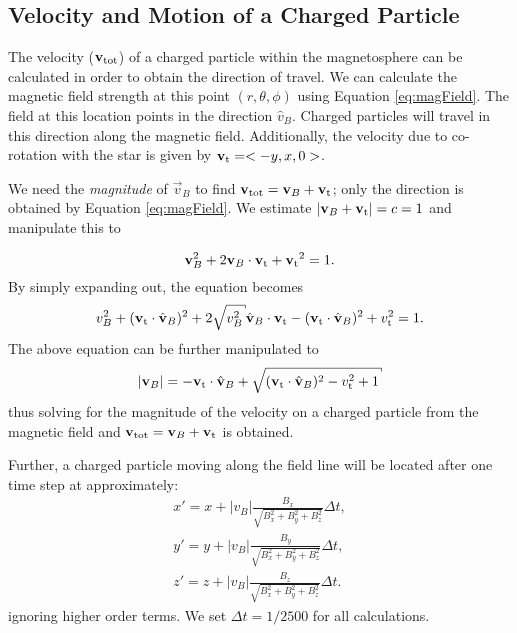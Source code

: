 \subsection{Velocity and Motion of a Charged Particle}

The velocity ($\vec{v}_{\rm tot}$)
of a charged particle within the magnetosphere 
can be calculated in order
to obtain the direction of travel.
We can calculate the magnetic field strength at this point $(r,\theta,\phi)$ using
Equation \ref{eq:magField}.  The field at this location points in the direction
$\hat{v}_B$.  Charged particles will travel in this direction along the magnetic
field. Additionally, the velocity due to co-rotation with the star is
given by $\vec{v}_{\rm t}=<-y,x,0>$.

We need the \textit{magnitude} of $\vec{v}_B$ to find
$\vec{v}_{\rm tot}=\vec{v}_B+\vec{v}_{\rm t}$;
only the direction is obtained by Equation \ref{eq:magField}.
We estimate $|\vec{v}_B+\vec{v}_{\rm t}|=c=1$ and manipulate
this to

\begin{equation}
\vec{v}_B^2+ 2 \vec{v}_B \cdot \vec{v_{\rm t}} + \vec{v_{\rm t}}^2 = 1.
\end{equation}
By simply expanding out, the equation becomes
\begin{equation}
v_B^2+(\vec{v}_{\rm t} \cdot \hat{v}_B)^2 + 2 \sqrt{v_B^2} \hat{v}_B \cdot \vec{v}_{\rm t} -(\vec{v}_{\rm t} \cdot \hat{v}_B)^2 + v_{\rm t}^2 = 1.
\end{equation}
The above equation can be further manipulated to
\begin{equation}
|\vec{v}_B|=-\vec{v}_{\rm t} \cdot \hat{v}_B + \sqrt{(\vec{v}_{\rm t} \cdot \hat{v}_B)^2 - v_{\rm t}^2 +1}
\end{equation}
thus solving for the magnitude of the velocity on a charged particle from the magnetic field
and $\vec{v}_{\rm tot}=\vec{v}_B+\vec{v}_{\rm t}$ is obtained.

Further, a charged particle moving along the field line will be located
after one time step at approximately:
\begin{equation}
  \begin{array}{c}
x'=x+|v_B|\frac{B_x}{\sqrt{B_x^2+B_y^2+B_z^2}} \Delta t, \\
y'=y+|v_B|\frac{B_y}{\sqrt{B_x^2+B_y^2+B_z^2}} \Delta t, \\
z'=z+|v_B|\frac{B_z}{\sqrt{B_x^2+B_y^2+B_z^2}} \Delta t .\end{array}
\end{equation}
ignoring higher order terms.
We set $\Delta t =1/2500$ for all calculations.

